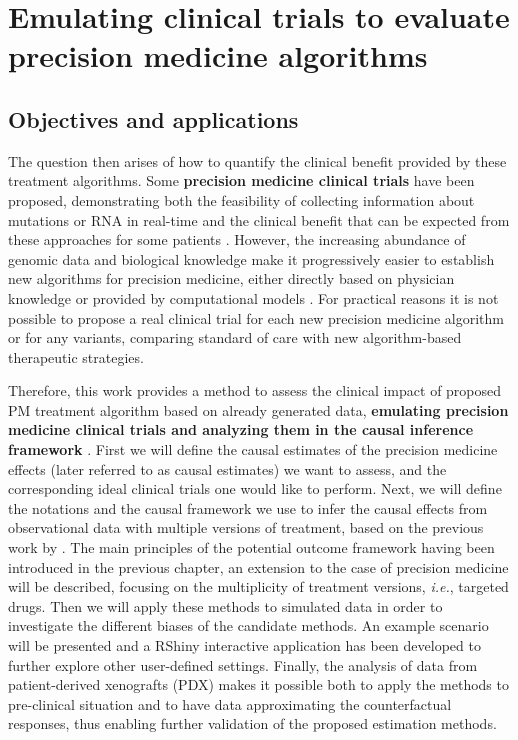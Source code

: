 \documentclass[a4paper,12pt,twoside,onecolumn,openright,final,oldfontcommands]{memoir}
\begin{document}
\section{Emulating clinical trials to evaluate precision medicine
algorithms}\label{emulating-clinical-trials-to-evaluate-precision-medicine-algorithms}

\subsection{Objectives and
applications}\label{objectives-and-applications}

The question then arises of how to quantify the clinical benefit
provided by these treatment algorithms. Some \textbf{precision medicine
clinical trials} have been proposed, demonstrating both the feasibility
of collecting information about mutations \citep{le2015molecularly} or
RNA \citep{rodon2019genomic} in real-time and the clinical benefit that
can be expected from these approaches for some patients
\citep{coyne2017defining}. However, the increasing abundance of genomic
data and biological knowledge make it progressively easier to establish
new algorithms for precision medicine, either directly based on
physician knowledge or provided by computational models
\citep{hansen2013computation}. For practical reasons it is not possible
to propose a real clinical trial for each new precision medicine
algorithm or for any variants, comparing standard of care with new
algorithm-based therapeutic strategies.

Therefore, this work provides a method to assess the clinical impact of
proposed PM treatment algorithm based on already generated data,
\textbf{emulating precision medicine clinical trials and analyzing them
in the causal inference framework} \citep{hernan2016using}. First we
will define the causal estimates of the precision medicine effects
(later referred to as causal estimates) we want to assess, and the
corresponding ideal clinical trials one would like to perform. Next, we
will define the notations and the causal framework we use to infer the
causal effects from observational data with multiple versions of
treatment, based on the previous work by \citet{vanderweele2013causal}.
The main principles of the potential outcome framework having been
introduced in the previous chapter, an extension to the case of
precision medicine will be described, focusing on the multiplicity of
treatment versions, \emph{i.e.}, targeted drugs. Then we will apply
these methods to simulated data in order to investigate the different
biases of the candidate methods. An example scenario will be presented
and a RShiny interactive application has been developed to further
explore other user-defined settings. Finally, the analysis of data from
patient-derived xenografts (PDX) makes it possible both to apply the
methods to pre-clinical situation and to have data approximating the
counterfactual responses, thus enabling further validation of the
proposed estimation methods.
\end{document}
